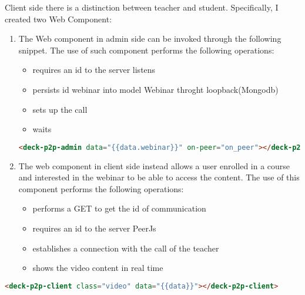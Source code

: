 Client side there is a distinction between teacher and student. Specifically, I created two Web Component:
\begin{enumerate}

\item The Web component in admin side can be invoked through the following snippet.
The use of such component performs the following operations:
\begin{itemize}
\item requires an id to the server listens
\item persists id webinar into model Webinar throght loopback(Mongodb)
\item sets up the call
\item waits
\end{itemize}

\begin{lstlisting}[language=html]
 <deck-p2p-admin data="{{data.webinar}}" on-peer="on_peer"></deck-p2p-admin>
\end{lstlisting}

\item The web component in client side instead allows a user enrolled in a course and interested in the webinar to be able to access the content.
The use of this component performs the following operations:
\begin{itemize}
\item performs a GET to get the id of communication
\item requires an id to the server PeerJs
\item establishes a connection with the call of the teacher
\item shows the video content in real time
\end{itemize}

\end{enumerate}
\begin{lstlisting}[language=html]
  <deck-p2p-client class="video" data="{{data}}"></deck-p2p-client>
\end{lstlisting}



